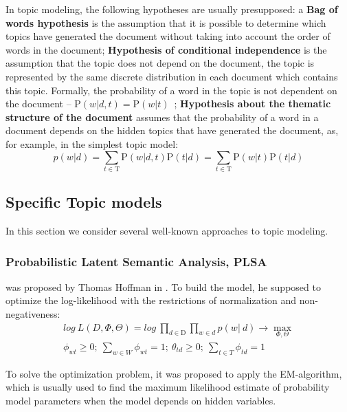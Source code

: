 \documentclass[runningheads,a4paper]{llncs}
\begin{document}
	In topic modeling, the following hypotheses are usually presupposed: a \textbf{Bag of words hypothesis} is the assumption that it is possible to determine which topics have generated the document without taking into account the order of words in the document; \textbf{Hypothesis of conditional independence} is the assumption that the topic does not depend on the document, the topic is represented by the same discrete distribution in each document which contains this topic. Formally, the probability of a word in the topic is not dependent on the document --  $\mathrm{P}(w|d, t)= \mathrm{P}(w|t)$~\cite{vorontsov2014additive,hofmann1999probabilistic,blei2003latent}; {\bf Hypothesis about the thematic structure of the document} assumes that the probability of a word in a document depends on the hidden topics that have generated the document, as, for example, in the simplest topic model:
		\begin{equation}
		p(w|d)=\sum_{t \in \mathrm{T}} \mathrm{P}(w|d, t)\mathrm{P}(t|d) = \sum_{t \in \mathrm{T}} \mathrm{P}(w|t)\mathrm{P}(t|d)
		\end{equation}
	
	\subsection{Specific Topic models}
    
	In this section we consider several well-known approaches to topic modeling.
    
    \subsubsection{Probabilistic Latent Semantic Analysis, PLSA} was proposed by Thomas Hoffman in \cite{hofmann1999probabilistic}. To build the model, he supposed to optimize the log-likelihood with the restrictions of normalization and non-negativeness:
	\begin{align}
	log~L(D, \Phi, \Theta) =  log~\prod_{d \in \mathrm{D}} \prod_{w \in d} p(w|~d) \rightarrow \max_{\Phi,\Theta} \\
	\phi_{wt} \geq 0;~\sum_{w \in W} \phi_{wt} = 1;~\theta_{td} \geq 0;~\sum_{t \in T} \phi_{td} = 1 
	\end{align}
	
To solve the optimization problem, it was proposed to apply the EM-algorithm, which is usually used to find the maximum likelihood estimate of probability model parameters when the model depends on hidden variables.
\end{document}
